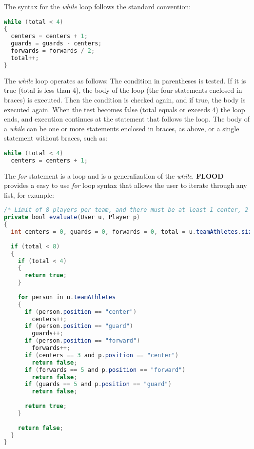 \documentclass[12pt]{report}
\begin{document}
The syntax for the \textit{while} loop follows the standard convention:

\begin{singlespace}
\begin{lstlisting}[language=Java,label=some-code,caption=While loop]
while (total < 4)
{
  centers = centers + 1;
  guards = guards - centers;
  forwards = forwards / 2;
  total++;
}
\end{lstlisting}
\end{singlespace}

The \textit{while} loop operates as follows: The condition in parentheses is tested. If it is true (total is less than 4), the body of the loop (the four statements enclosed in braces) is executed. Then the condition is checked again, and if true, the body is executed again. When the test becomes false (total equals or exceeds 4) the loop ends, and execution continues at the statement that follows the loop. The body of a \textit{while} can be one or more statements enclosed in braces, as above, or a single statement without braces, such as:

\begin{singlespace}
\begin{lstlisting}[language=Java,label=some-code,caption=Single statement while loop]
while (total < 4)
  centers = centers + 1;
\end{lstlisting}
\end{singlespace}

The \textit{for} statement is a loop and is a generalization of the \textit{while}. \textbf{FLOOD} provides a easy to use \textit{for} loop syntax that allows the user to iterate through any list, for example:

\begin{singlespace}
\begin{lstlisting}[language=Java,label=some-code,caption=For loop]
/* Limit of 8 players per team, and there must be at least 1 center, 2 guards and 2 forwards per team. */
private bool evaluate(User u, Player p)
{
  int centers = 0, guards = 0, forwards = 0, total = u.teamAthletes.size();
  
  if (total < 8)
  {
    if (total < 4)
    {
      return true;
    }
    
    for person in u.teamAthletes
    {
      if (person.position == "center")
        centers++;
      if (person.position == "guard")
        guards++;
      if (person.position == "forward")
        forwards++;
      if (centers == 3 and p.position == "center")
        return false;
      if (forwards == 5 and p.position == "forward")
        return false;
      if (guards == 5 and p.position == "guard")
        return false;
    
      return true;
    }
    
    return false;
  }
}
\end{lstlisting}
\end{singlespace}
\end{document}
